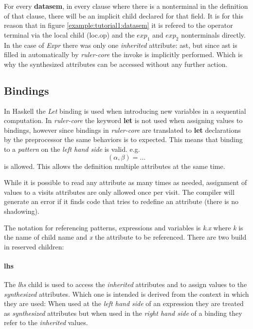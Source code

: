 \documentclass[twoside, titlepage, openright, a4paper]{book}
\newcommand{\rcore}{\emph{ruler-core }}
\begin{document}
For every \textbf{datasem}, in every clause where there is a nonterminal in the definition of that clause, there will be an implicit child declared for that field. It is for this reason that in figure \ref{example:tutorial1:datasem} it is refered to the operator terminal via the local child (loc.op) and the \emph{\ensuremath{exp_1}} and \emph{\ensuremath{exp_2}} nonterminals directly. In the case of \emph{Expr} there was only one \emph{inherited} attribute: ast, but since ast is filled in automatically by \rcore the invoke is implicitly performed. Which is why the synthesized attributes can be accessed without any further action. 

\subsection{Bindings}
\label{bindings}
In Haskell the \emph{Let} binding is used when introducing new variables in a sequential computation. In \rcore the keyword \textbf{let} is not used when assigning values to bindings, however since bindings in \rcore are translated to \textbf{let} declarations by the preprocessor the same behaviors is to expected. This means that binding to a \emph{pattern} on the \emph{left hand side} is valid. e.g. \[ (\alpha, \beta) = \ldots \] is allowed. This allows the definition multiple attributes at the same time.

While it is possible to read any attribute as many times as needed, assignment of values to a visits attributes are only allowed once per visit. The compiler will generate an error if it finds code that tries to redefine an attribute (there is no shadowing).

The notation for referencing patterns, expressions and variables is \emph{k}.\emph{x} where \emph{k} is the name of child name and \emph{x} the attribute to be referenced. There are two build in reserved children:

\paragraph{lhs}
The \emph{lhs} child is used to access the \emph{inherited} attributes and to assign values to the \emph{synthesized} attributes. Which one is intended is derived from the context in which they are used: When used at the \emph{left hand side} of an expression they are treated as \emph{synthesized} attributes but when used in the \emph{right hand side} of a binding they refer to the \emph{inherited} values.
 
\end{document}

